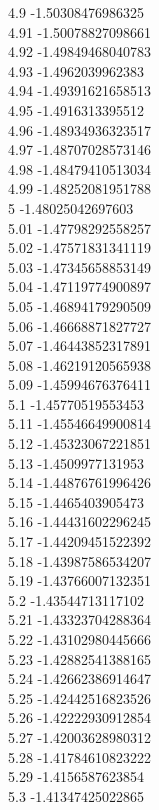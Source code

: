 {4.9	-1.50308476986325\\
4.91	-1.50078827098661\\
4.92	-1.49849468040783\\
4.93	-1.4962039962383\\
4.94	-1.49391621658513\\
4.95	-1.4916313395512\\
4.96	-1.48934936323517\\
4.97	-1.48707028573146\\
4.98	-1.48479410513034\\
4.99	-1.48252081951788\\
5	-1.48025042697603\\
5.01	-1.47798292558257\\
5.02	-1.47571831341119\\
5.03	-1.47345658853149\\
5.04	-1.47119774900897\\
5.05	-1.46894179290509\\
5.06	-1.46668871827727\\
5.07	-1.46443852317891\\
5.08	-1.46219120565938\\
5.09	-1.45994676376411\\
5.1	-1.45770519553453\\
5.11	-1.45546649900814\\
5.12	-1.45323067221851\\
5.13	-1.4509977131953\\
5.14	-1.44876761996426\\
5.15	-1.4465403905473\\
5.16	-1.44431602296245\\
5.17	-1.44209451522392\\
5.18	-1.43987586534207\\
5.19	-1.43766007132351\\
5.2	-1.43544713117102\\
5.21	-1.43323704288364\\
5.22	-1.43102980445666\\
5.23	-1.42882541388165\\
5.24	-1.42662386914647\\
5.25	-1.42442516823526\\
5.26	-1.42222930912854\\
5.27	-1.42003628980312\\
5.28	-1.41784610823222\\
5.29	-1.4156587623854\\
5.3	-1.41347425022865\\
}

